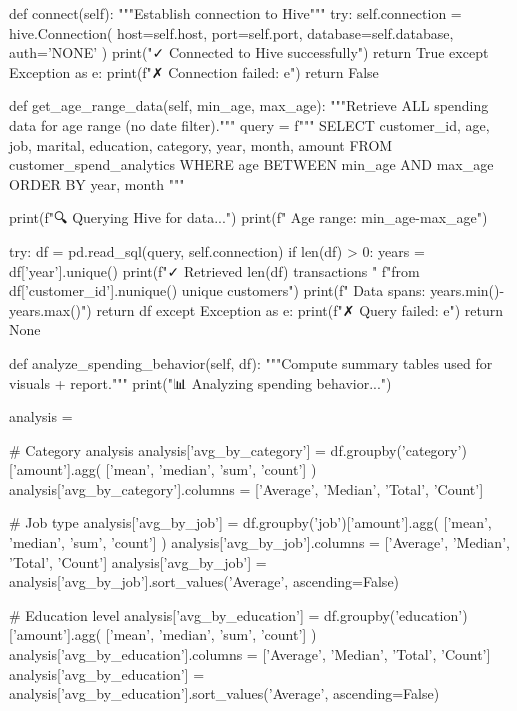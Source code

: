     def connect(self):
        """Establish connection to Hive"""
        try:
            self.connection = hive.Connection(
                host=self.host,
                port=self.port,
                database=self.database,
                auth='NONE'
            )
            print("✓ Connected to Hive successfully")
            return True
        except Exception as e:
            print(f"✗ Connection failed: {e}")
            return False

    def get_age_range_data(self, min_age, max_age):
        """Retrieve ALL spending data for age range (no date filter)."""
        query = f"""
        SELECT 
            customer_id,
            age,
            job,
            marital,
            education,
            category,
            year,
            month,
            amount
        FROM customer_spend_analytics
        WHERE age BETWEEN {min_age} AND {max_age}
        ORDER BY year, month
        """

        print(f"\n🔍 Querying Hive for data...")
        print(f"   Age range: {min_age}-{max_age}")

        try:
            df = pd.read_sql(query, self.connection)
            if len(df) > 0:
                years = df['year'].unique()
                print(f"✓ Retrieved {len(df)} transactions "
                      f"from {df['customer_id'].nunique()} unique customers")
                print(f"   Data spans: {years.min()}-{years.max()}")
            return df
        except Exception as e:
            print(f"✗ Query failed: {e}")
            return None

    def analyze_spending_behavior(self, df):
        """Compute summary tables used for visuals + report."""
        print("\n📊 Analyzing spending behavior...")

        analysis = {}

        # Category analysis
        analysis['avg_by_category'] = df.groupby('category')['amount'].agg(
            ['mean', 'median', 'sum', 'count']
        )
        analysis['avg_by_category'].columns = ['Average', 'Median', 'Total', 'Count']

        # Job type
        analysis['avg_by_job'] = df.groupby('job')['amount'].agg(
            ['mean', 'median', 'sum', 'count']
        )
        analysis['avg_by_job'].columns = ['Average', 'Median', 'Total', 'Count']
        analysis['avg_by_job'] = analysis['avg_by_job'].sort_values('Average', ascending=False)

        # Education level
        analysis['avg_by_education'] = df.groupby('education')['amount'].agg(
            ['mean', 'median', 'sum', 'count']
        )
        analysis['avg_by_education'].columns = ['Average', 'Median', 'Total', 'Count']
        analysis['avg_by_education'] = analysis['avg_by_education'].sort_values('Average', ascending=False)

